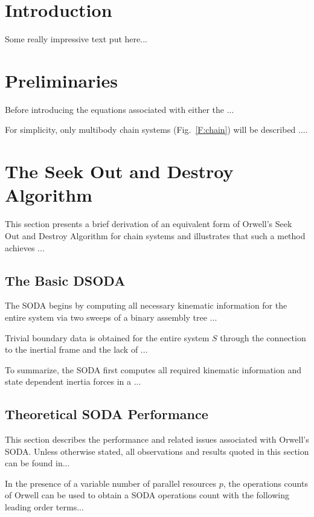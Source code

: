 \documentclass[12pt]{article}
\begin{document}

\section{Introduction}

Some really impressive text put here...

\section{Preliminaries}\label{S:Preliminaries}
Before introducing the equations associated with either the ...


For simplicity, only multibody chain systems (Fig.~\ref{F:chain})
will be described ....

\section{The Seek Out and Destroy Algorithm}\label{S:DCA}
This section presents a brief derivation of an equivalent form of
Orwell's Seek Out and Destroy Algorithm for chain systems and
illustrates that such a method achieves ...

\subsection{The Basic DSODA}\label{S:DCA}

The SODA begins by computing all necessary kinematic information for
the entire system via two sweeps of a binary assembly tree ...

Trivial boundary data is obtained for the entire system $S$ through
the connection to the inertial frame and the lack of ...


To summarize, the SODA first computes all required kinematic
information and state dependent inertia forces in a ...

\subsection{Theoretical SODA Performance}\label{SubSect:TheorySODAPerf} This
section describes the performance and related issues associated with
Orwell's SODA.  Unless otherwise stated, all observations and
results quoted in this section can be found in...


In the presence of a variable number of parallel resources $p$, the
operations counts of Orwell can be used to obtain a SODA operations
count with the following leading order terms...
\end{document}

